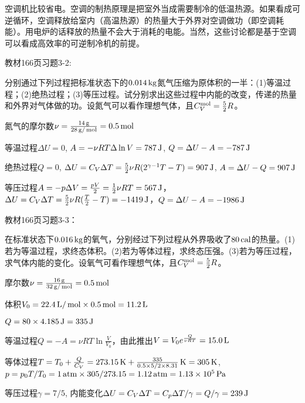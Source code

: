 \documentclass[CJK]{beamer}
\begin{document}
\begin{frame}
  \bch
  空调机比较省电。空调的制热原理是把室外当成需要制冷的低温热源。如果看成可逆循环，空调释放给室内（高温热源）的热量大于外界对空调做功（即空调耗能）。用电炉的话释放的热量不会大于消耗的电能。当然，这些讨论都是基于空调可以看成高效率的可逆制冷机的前提。
  \ech
\end{frame}

\begin{frame}
  \chtitle{\proid   (\stwo)}
  \bch
  教材166页习题3-2:

  分别通过下列过程把标准状态下的$0.014\,\mathrm{kg}$氮气压缩为原体积的一半：(1)等温过程；(2)绝热过程；(3)等压过程。试分别求出这些过程中内能的改变，传递的热量和外界对气体做的功。设氮气可以看作理想气体，且$C_V^{\rm mol} = \frac{5}{2}R$。
  
  \ech
\end{frame}


\begin{frame}
  \bch
  {\small
  氮气的摩尔数$\nu = \frac{14\,\mathrm{g}}{28\,\mathrm{g}/\,\mathrm{mol}} = 0.5\,\mathrm{mol}$
  \bitem
\item{等温过程$\Delta U = 0$, $A = -\nu R T\Delta \ln V = 787\,\mathrm{J}$, $Q = \Delta U - A = - 787\,\mathrm{J}$
}
\item{绝热过程$Q=0$, $\Delta U = C_V \Delta T = \frac{5}{2}\nu R (2^{\gamma-1}T -T) = 907\,\mathrm{J}$, $A = \Delta U - Q = 907\,\mathrm{J}$}
\item{等压过程$A = -p\Delta V = \frac{pV}{2} = \frac{1}{2}\nu R T = 567\,\mathrm{J}$，$\Delta U = C_V \Delta T = \frac{5}{2}\nu R (\frac{T}{2}-T) = -1419\,\mathrm{J}$，$Q = \Delta U - A = -1986 \,\mathrm{J}$}
  \eitem
  }
  \ech
\end{frame}

\begin{frame}
  \chtitle{\proid   (\stwo)}
  \bch
  教材166页习题3-3：

  
  在标准状态下$0.016\,\mathrm{kg}$的氧气，分别经过下列过程从外界吸收了$80\,\mathrm{cal}$的热量。(1)若为等温过程，求终态体积。(2)若为等体过程，求终态压强。(3)若为等压过程，求气体内能的变化。设氧气可看作理想气体，且$C_V^{\rm mol} = \frac{5}{2}R$。
  \ech
\end{frame}

\begin{frame}
  \bch
  摩尔数$\nu = \frac{16\,\mathrm{g}}{32\,\mathrm{g}/\,\mathrm{mol}} = 0.5\,\mathrm{mol}$
  
  体积$V_0 = 22.4\,\mathrm{L}/\,\mathrm{mol} \times 0.5\,\mathrm{mol} = 11.2\,\mathrm{L}$

  $Q = 80\times 4.185 \,\mathrm{J} = 335\,\mathrm{J}$
  \bitem
\item{等温过程$Q = -A = \nu RT \ln\frac{V}{V_0}$，由此推出$V = V_0e^{\frac{Q}{\nu RT}} = 15.0\,\mathrm{L}$}
\item{等体过程$T = T_0+ \frac{Q}{C_V} = 273.15\,\mathrm{K} + \frac{335}{0.5\times 5/2\times 8.31}\,\mathrm{K} = 305\,\mathrm{K}$, $p = p_0 T/T_0 = 1\,\mathrm{atm} \times 305/273.15 = 1.12 \,\mathrm{atm} = 1.13\times 10^5\,\mathrm{Pa}$}
\item{等压过程$\gamma = 7/5$, 内能变化$\Delta U = C_V\Delta T = C_p\Delta T /\gamma = Q/\gamma = 239\,\mathrm{J}$}
  \eitem
  
  \ech
\end{frame}
\end{document}
